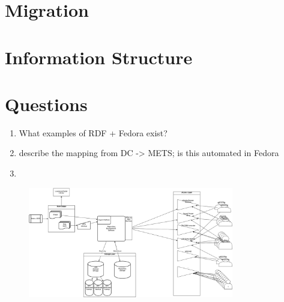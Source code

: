 \documentclass[oneside, 12pt]{article}
\begin{document}
\section{Migration}


\section{Information Structure}


\section{Questions}
\begin{enumerate}
  \item{What examples of RDF + Fedora exist?}
  \item{describe the mapping from DC -> METS; is this automated in Fedora}
  \item{}
\end{enumerate}

\begin{figure}[H]
  \centering
  \includegraphics[width=0.8\textwidth]{apc-01.png}
\end{figure}


\end{document}
